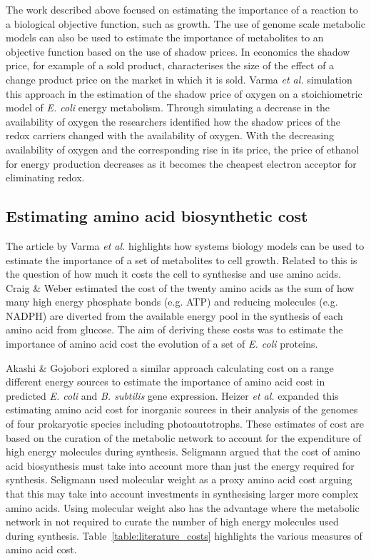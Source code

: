 The work described above focused on estimating the importance of a reaction to a biological objective function, such as growth. The use of genome scale metabolic models can also be used to estimate the importance of metabolites to an objective function based on the use of shadow prices. In economics the shadow price, for example of a sold product, characterises the size of the  effect of a change product price on the market in which it is sold. Varma \emph{et al.} \cite{varma1993} simulation this approach in the estimation of the shadow price of oxygen on a stoichiometric model of \emph{E. coli} energy metabolism. Through simulating a decrease in the availability of oxygen the researchers identified how the shadow prices of the redox carriers changed with the availability of oxygen. With the decreasing availability of oxygen and the corresponding rise in its price, the price of ethanol for energy production decreases as it becomes the cheapest electron acceptor for eliminating redox.

\subsection{Estimating amino acid biosynthetic cost}

The article by Varma \emph{et al.} highlights how systems biology models can be used to estimate the importance of a set of metabolites to cell growth. Related to this is the question of how much it costs the cell to synthesise and use amino acids. Craig \& Weber \cite{craig1998} estimated the cost of the twenty amino acids as the sum of how many high energy phosphate bonds (e.g. ATP) and reducing molecules (e.g. NADPH) are diverted from the available energy pool in the synthesis of each amino acid from glucose. The aim of deriving these costs was to estimate the importance of amino acid cost the evolution of a set of \emph{E. coli} proteins.

Akashi \& Gojobori \cite{akashi2002} explored a similar approach calculating cost on a range different energy sources to estimate the importance of amino acid cost in predicted \emph{E. coli} and \emph{B. subtilis} gene expression. Heizer \emph{et al.} \cite{heizer2006} expanded this estimating amino acid cost for inorganic sources in their analysis of the genomes of four prokaryotic species including photoautotrophs. These estimates of cost are based on the curation of the metabolic network to account for the expenditure of high energy molecules during synthesis. Seligmann argued \cite{seligmann2003} that the cost of amino acid biosynthesis must take into account more than just the energy required for synthesis. Seligmann used molecular weight as a proxy amino acid cost arguing that this may take into account investments in synthesising larger more complex amino acids. Using molecular weight also has the advantage where the metabolic network in not required to curate the number of high energy molecules used during synthesis. Table~\ref{table:literature_costs} highlights the various measures of amino acid cost.

